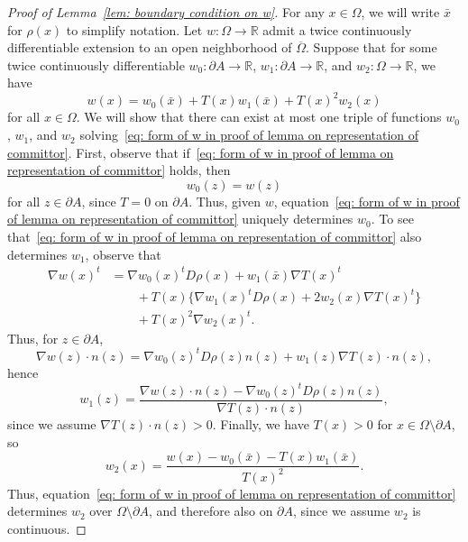 \documentclass[reqno]{amsart}
\newcommand{\Real}{\mathbb{R}}
\newcommand{\1}{\mathds{1}}
\newcommand{\grad}{\nabla}
\theoremstyle{definition}
\theoremstyle{remark}
\begin{document}
\begin{proof}[Proof of Lemma~\ref{lem: boundary condition on w}]
  For any $x \in \Omega$, we will write $\bar x$ for $\rho(x)$ to simplify notation. Let $w: \Omega \rightarrow \Real$ admit a twice continuously differentiable extension to an open neighborhood of $\overline{\Omega}$. Suppose that for some twice continuously differentiable $w_0 : \partial A \rightarrow \Real$, $w_1 : \partial A \rightarrow \Real$, and $w_2: \Omega \rightarrow \Real$, we have
  \begin{equation}\label{eq: form of w in proof of lemma on representation of committor}
    w(x)  = w_0 (\bar x) + T(x) w_1(\bar x) + T(x)^2 w_2(x)
  \end{equation}
  for all $x \in \Omega$.
  We will show that there can exist at most one triple of functions $w_0$, $w_1$, and $w_2$ solving~\eqref{eq: form of w in proof of lemma on representation of committor}.
  First, observe that if~\eqref{eq: form of w in proof of lemma on representation of committor} holds, then 
  \begin{equation}\label{eq: w_0}
    w_0 (z) = w(z)
  \end{equation}
  for all $z \in \partial A$, since $T=0$ on $\partial A$. Thus, given $w$, equation~\eqref{eq: form of w in proof of lemma on representation of committor} uniquely determines $w_0$. To see that~\eqref{eq: form of w in proof of lemma on representation of committor} also determines $w_1$, observe that 
  \begin{align*}
    \grad w(x)^t  &= \grad w_0 ( x)^t D \rho (x ) + w_1(\bar x)\grad T(x)^t \\
                          &\qquad + T(x) \Big \{\grad w_1 (x)^t D \rho (x) + 2  w_2(x) \grad T(x)^t \Big \} \\
    &\qquad +  T(x)^2 \grad w_2(x)^t.
  \end{align*}
  Thus, for $z \in \partial A$, 
  \begin{equation}\label{eq: normal derivative of w}
    \grad w(z) \cdot n(z) = \grad w_0(z)^t D\rho(z) n(z) + w_1(z) \grad T(z) \cdot n(z), 
  \end{equation}
  hence
  \begin{equation}\label{eq: w1}
     w_1(z) =  \frac{\grad w(z) \cdot n(z) - \grad w_0(z)^t D\rho(z) n(z)}{\grad T(z) \cdot n(z)},
  \end{equation}
  since we assume $\grad T(z) \cdot n(z) >0$.
  Finally, we have $T(x) >0$ for $x \in \Omega \setminus \partial A$, so
  \begin{equation}\label{eq: w2}
    w_2(x) = \frac{w(x) - w_0 (\bar x) - T(x) w_1(\bar x)}{T(x)^2}.
  \end{equation}
  Thus, equation~\eqref{eq: form of w in proof of lemma on representation of committor} determines $w_2$ over $\Omega \setminus \partial A$, and therefore also on $\partial A$, since we assume $w_2$ is continuous. 


\end{proof}
\end{document}
